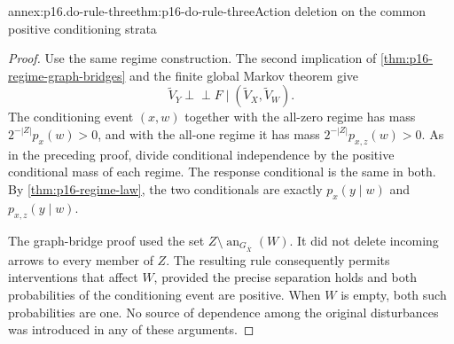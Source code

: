 \begin{annexitem}{annex:p16.do-rule-three}{thm:p16-do-rule-three}{Action deletion on the common positive conditioning strata}
\begin{proof}
Use the same regime construction. The second implication of
\cref{thm:p16-regime-graph-bridges} and the finite global Markov
theorem give
\[
 \widetilde V_Y\mathrel{\perp\!\!\!\perp}F
             \mid(\widetilde V_X,\widetilde V_W).
\]
The conditioning event \((x,w)\) together with the all-zero
regime has mass \(2^{-|Z|}p_x(w)>0\), and with the all-one
regime it has mass \(2^{-|Z|}p_{x,z}(w)>0\). As in the preceding
proof, divide conditional independence by the positive conditional
mass of each regime. The response conditional is the same in both.
By \cref{thm:p16-regime-law}, the two conditionals are exactly
\(p_x(y\mid w)\) and \(p_{x,z}(y\mid w)\).

The graph-bridge proof used the set
\(Z\setminus\operatorname{an}_{G_{\overline X}}(W)\).
It did not delete incoming arrows to every member of \(Z\).
The resulting rule consequently permits interventions that affect
\(W\), provided the precise separation holds and both probabilities
of the conditioning event are positive. When \(W\) is empty,
both such probabilities are one. No source of dependence among the
original disturbances was introduced in any of these arguments.
\end{proof}
\end{annexitem}

